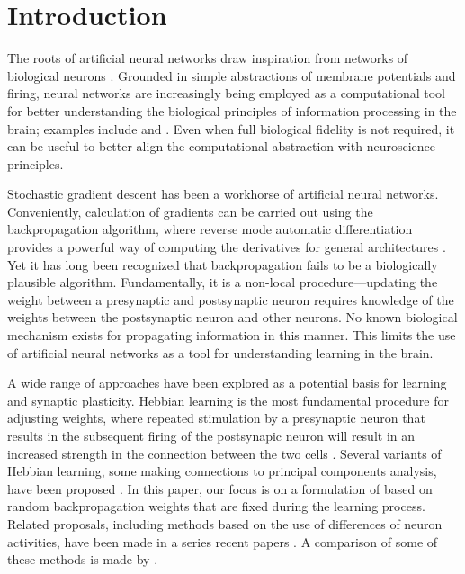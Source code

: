 \section{Introduction}

The roots of artificial neural networks draw inspiration from networks of biological neurons \citep{pdp,elman,medler}. Grounded in simple abstractions of membrane potentials and firing, neural networks are increasingly being employed as a computational tool for better understanding the biological principles of information processing in the brain; examples include \cite{ilker1} and \cite{yamins2}. Even when full biological fidelity is not required, it can be useful to better align the computational abstraction with neuroscience principles.

Stochastic gradient descent has been a workhorse of artificial neural networks. Conveniently, calculation of gradients can be carried out using the backpropagation algorithm, where reverse mode automatic differentiation provides a powerful way of computing the derivatives for general architectures \citep{rumelhart:86}.
Yet it has long been recognized that backpropagation fails to be a biologically plausible algorithm. Fundamentally, it is a non-local procedure---updating the weight between a presynaptic and postsynaptic neuron requires knowledge of the weights between the postsynaptic neuron and other neurons. No known biological mechanism exists for propagating information in this manner. This limits the use of artificial neural networks as a tool for understanding learning in the brain.

A wide range of approaches have been explored as a potential basis for learning and synaptic plasticity. Hebbian learning is the most fundamental procedure for adjusting weights, where
repeated stimulation by a presynaptic neuron that results in the subsequent
firing of the postsynapic neuron will result in an increased strength in the connection
between the two cells \citep{hebb1,paulsen}. Several variants of Hebbian learning, some making connections to principal components analysis, have been proposed
\citep{oja,sejnowski1,sejnowski2}. In this paper, our focus is on a formulation of \cite{lillicrap2016random} based on random
backpropagation weights that are fixed during the learning process.
Related proposals, including methods based on the use of differences of neuron activities, have been made in a series recent papers \citep{akrout,bellec,lillicrap2020backpropagation}. A comparison of some of these methods is made by \cite{bartunov}.



